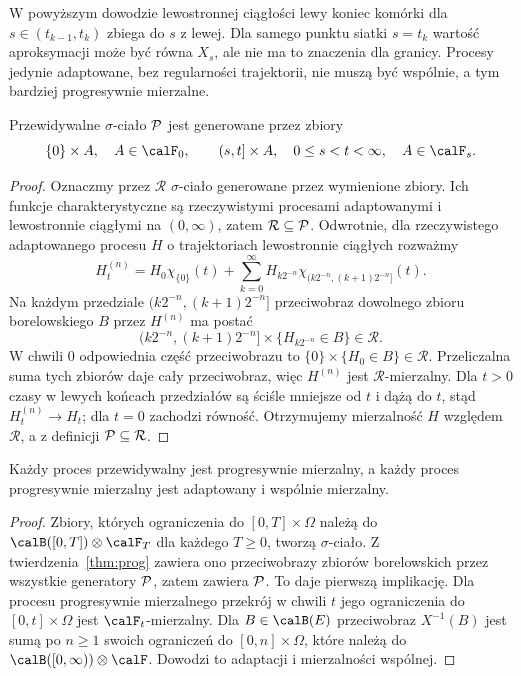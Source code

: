 \begin{uwaga}
W powyższym dowodzie lewostronnej ciągłości lewy koniec
komórki dla $s\in(t_{k-1},t_k)$ zbiega do $s$ z lewej.
Dla samego punktu siatki $s=t_k$ wartość
aproksymacji może być równa $X_s$, ale nie ma to
znaczenia dla granicy. Procesy jedynie adaptowane,
bez regularności trajektorii, nie muszą być wspólnie,
a tym bardziej progresywnie mierzalne.
\end{uwaga}

\begin{stwierdzenie}
Przewidywalne $\sigma$-ciało $\cal P$ jest generowane przez
zbiory
\[
\{0\}\times A,\quad A\in\calF_0,\qquad
(s,t]\times A,\quad 0\le s<t<\infty,\quad A\in\calF_s.
\]
\end{stwierdzenie}
\begin{proof}
Oznaczmy przez $\mathcal{R}$ $\sigma$-ciało generowane przez
wymienione zbiory. Ich funkcje charakterystyczne są
rzeczywistymi procesami adaptowanymi i lewostronnie
ciągłymi na $(0,\infty)$, zatem $\mathcal{R}\subseteq\cal P$.
Odwrotnie, dla rzeczywistego adaptowanego procesu $H$
o trajektoriach lewostronnie ciągłych rozważmy
\[
H^{(n)}_t=H_0\chi_{\{0\}}(t)+
\sum_{k=0}^\infty H_{k2^{-n}}
\chi_{(k2^{-n},(k+1)2^{-n}]}(t).
\]
Na każdym przedziale $(k2^{-n},(k+1)2^{-n}]$
przeciwobraz dowolnego zbioru borelowskiego $B$ przez
$H^{(n)}$ ma postać
\[
(k2^{-n},(k+1)2^{-n}]\times
\{H_{k2^{-n}}\in B\}\in\mathcal{R}.
\]
W chwili $0$ odpowiednia część przeciwobrazu to
$\{0\}\times\{H_0\in B\}\in\mathcal{R}$.
Przeliczalna suma tych zbiorów daje cały przeciwobraz,
więc $H^{(n)}$ jest $\mathcal{R}$-mierzalny.
Dla $t>0$ czasy w lewych końcach przedziałów są ściśle
mniejsze od $t$ i dążą do $t$, stąd $H^{(n)}_t\to H_t$;
dla $t=0$ zachodzi równość. Otrzymujemy mierzalność $H$
względem $\mathcal{R}$, a z definicji $\cal P\subseteq\mathcal{R}$.
\end{proof}

\begin{stwierdzenie}
Każdy proces przewidywalny jest progresywnie mierzalny,
a każdy proces progresywnie mierzalny jest adaptowany
i wspólnie mierzalny.
\end{stwierdzenie}
\begin{proof}
Zbiory, których ograniczenia do $[0,T]\times\Omega$
należą do $\calB([0,T])\otimes\calF_T$ dla każdego $T\ge0$,
tworzą $\sigma$-ciało. Z twierdzenia~\ref{thm:prog}
zawiera ono przeciwobrazy zbiorów borelowskich przez
wszystkie generatory $\cal P$, zatem zawiera $\cal P$.
To daje pierwszą implikację. Dla procesu progresywnie
mierzalnego przekrój w chwili $t$ jego ograniczenia
do $[0,t]\times\Omega$ jest $\calF_t$-mierzalny.
Dla $B\in\calB(E)$ przeciwobraz $X^{-1}(B)$ jest sumą
po $n\ge1$ swoich ograniczeń do $[0,n]\times\Omega$,
które należą do $\calB([0,\infty))\otimes\calF$.
Dowodzi to adaptacji i mierzalności wspólnej.
\end{proof}

